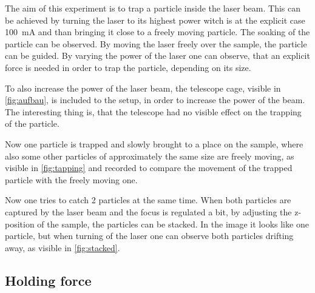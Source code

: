 \documentclass[12pt,english,ngerman]{scrartcl}
\begin{document}
The aim of this experiment is to trap a particle inside the laser beam. This
can be achieved by turning the laser to its highest power witch is at the
explicit case \SI{100}{\milli\ampere} and than bringing it close to a freely
moving particle. The soaking of the particle can be observed. By moving the
laser freely over the sample, the particle can be guided. By varying the power
of the laser one can observe, that an explicit force is needed in order to trap
the particle, depending on its size.

To also increase the power of the laser beam, the telescope cage, visible in
\autoref{fig:aufbau}, is included to the setup, in order to increase the power
of the beam. The interesting thing is, that the telescope had no visible effect
on the trapping of the particle.

Now one particle is trapped and slowly brought to a place on the sample, where
also some other particles of approximately the same size are freely moving, as
visible in \autoref{fig:tapping} and recorded to compare the movement of the
trapped particle with the freely moving one.


Now one tries to catch 2 particles at the same time. When both particles are
captured by the laser beam and the focus is regulated a bit, by adjusting the
z-position of the sample, the particles can be stacked. In the image it looks
like one particle, but when turning of the laser one can observe both particles
drifting away, as visible in \autoref{fig:stacked}.


\subsection{Holding force}
\end{document}
